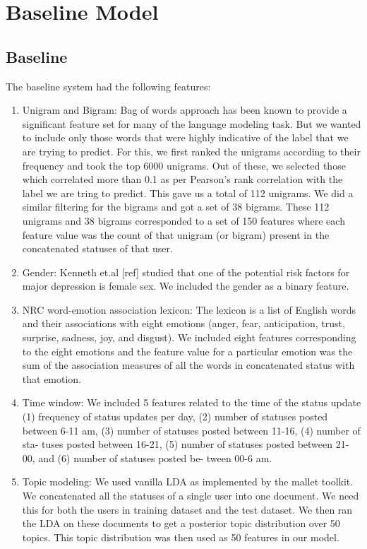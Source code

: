 \section{Baseline Model}
\label{sec:baseline}

\subsection{Baseline}
The  baseline system had the following features:
\begin{enumerate}
  \item Unigram and Bigram: Bag of words approach has been known to provide a significant feature set for many of the language modeling task. But we wanted to include only those words that were highly indicative of the label that we are trying to predict. For this, we first ranked the unigrams according to their frequency and took the top 6000 unigrams. Out of these, we selected those which correlated more than 0.1 as per Pearson's rank correlation with the label we are tring to predict. This gave us a total of 112 unigrams. We did a similar filtering for the bigrams and got a set of 38 bigrams. These 112 unigrams and 38 bigrams corresponded to a set of 150 features where each feature value was the count of that unigram (or bigram) present in the concatenated statuses of that user.
  \item Gender: Kenneth et.al [ref] studied that one of the potential risk factors for major depression is female sex. We included the gender as a binary feature.
  \item NRC word-emotion association lexicon: The lexicon is a list of English words and their associations with eight emotions (anger, fear, anticipation, trust, surprise, sadness, joy, and disgust). We included eight features corresponding to the eight emotions and the feature value for a particular emotion was the sum of the association measures of all the words in concatenated status with that emotion.
  \item Time window:  We included 5 features  related to the time of the status update (1) frequency of status updates per day, (2) number of statuses posted between 6-11 am, (3) number of statuses posted between 11-16, (4) number of sta- tuses posted between 16-21, (5) number of statuses posted between 21-00, and (6) number of statuses posted be- tween 00-6 am.
  \item Topic modeling: We used vanilla LDA as implemented by the mallet toolkit. We concatenated all the statuses of a single user into one document. We need this for both the users in training dataset and the test dataset. We then ran the LDA on these documents to get a posterior topic distribution over 50 topics. This topic distribution was then used as 50 features in our model.
\end{enumerate}

